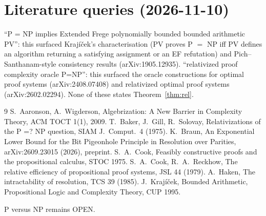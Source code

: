 \documentclass[11pt]{article}
\theoremstyle{definition}
\begin{document}
\section*{Literature queries (2026-11-10)}
``P = NP implies Extended Frege polynomially bounded bounded arithmetic PV'': this
surfaced Krajíček's characterisation (PV proves P $=$ NP iff PV defines an algorithm
returning a satisfying assignment or an EF refutation) and Pich--Santhanam-style
consistency results (arXiv:1905.12935). ``relativized proof complexity oracle P=NP'':
this surfaced the oracle constructions for optimal proof systems (arXiv:2408.07408) and
relativized optimal proof systems (arXiv:2602.02294). None of these states
Theorem~\ref{thm:rel}.

\begin{thebibliography}{9}
 S.~Aaronson, A.~Wigderson, Algebrization: A New Barrier in Complexity Theory, ACM TOCT 1(1), 2009.
 T.~Baker, J.~Gill, R.~Solovay, Relativizations of the P =? NP question, SIAM J.\ Comput.\ 4 (1975).
 K.~Braun, An Exponential Lower Bound for the Bit Pigeonhole Principle in Resolution over Parities, arXiv:2609.23015 (2026), preprint.
 S.~A.~Cook, Feasibly constructive proofs and the propositional calculus, STOC 1975.
 S.~A.~Cook, R.~A.~Reckhow, The relative efficiency of propositional proof systems, JSL 44 (1979).
 A.~Haken, The intractability of resolution, TCS 39 (1985).
 J.~Krajíček, Bounded Arithmetic, Propositional Logic and Complexity Theory, CUP 1995.
\end{thebibliography}

\noindent P versus NP remains OPEN.
\end{document}
